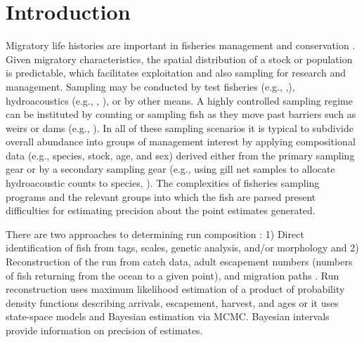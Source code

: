 \documentclass[12pt]{article}
\begin{document}
\section{Introduction}
Migratory life histories are important in fisheries management and conservation  \cite{Hilborn1992,McDowall2009}. Given migratory characteristics, the spatial distribution of a stock or population is predictable, which facilitates exploitation and also sampling for research and management. Sampling may be conducted by test fisheries (e.g., ,), hydroacoustics (e.g., , ), or by other means. A highly controlled sampling regime can be instituted by counting or sampling fish as they move past barriers such as weirs or dams (e.g., ). In all of these sampling scenarios it is typical to subdivide overall abundance into groups of management interest by applying compositional data (e.g., species, stock, age, and sex) derived either from the primary sampling gear or by a secondary sampling gear (e.g., using gill net samples to allocate hydroacoustic counts to species, ). The complexities of fisheries sampling programs and the relevant groups into which the fish are parsed present difficulties for estimating precision about the point estimates generated.

There are two approaches to determining run composition \cite{Starr1988}: 1) Direct identification of fish from tags, scales, genetic analysis, and/or morphology and 2) Reconstruction of the run from catch data, adult escapement numbers (numbers of fish returning from the ocean to a given point), and migration paths \cite{Buckland2007,Newman2009,Branch2010}.  Run reconstruction uses maximum likelihood estimation of a product of probability density functions describing arrivals, escapement, harvest, and ages or it uses state-space models and Bayesian estimation via MCMC. Bayesian intervals provide information on precision of estimates.
\end{document}

